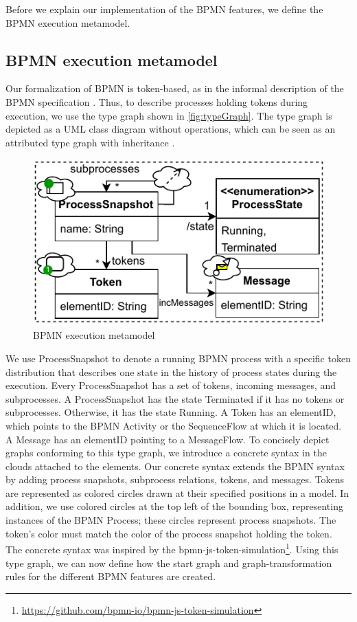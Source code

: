\documentclass[runningheads]{llncs}
\begin{document}
Before we explain our implementation of the BPMN features, we define the BPMN execution metamodel.

\subsection{BPMN execution metamodel}

Our formalization of BPMN is token-based, as in the informal description of the BPMN specification \cite{objectmanagementgroupBusinessProcessModel2013}.
Thus, to describe processes holding tokens during execution, we use the type graph shown in \autoref{fig:typeGraph}.
The type graph is depicted as a UML class diagram without operations, which can be seen as an attributed type graph with inheritance \cite{heckelGraphTransformationSoftware2020}.

\begin{figure}[ht]
  \centering
  \includegraphics[width=0.6\linewidth]{images/bpmn_semantics-typegraph.pdf}
  \caption{BPMN execution metamodel}
  \label{fig:typeGraph}
\end{figure}

We use \textsf{ProcessSnapshot} to denote a running BPMN process with a specific token distribution that describes one state in the history of process states during the execution.
Every \textsf{ProcessSnapshot} has a set of \textsf{tokens}, incoming \textsf{messages}, and \textsf{subprocesses}.
A \textsf{ProcessSnapshot} has the state \textsf{Terminated} if it has no \textsf{tokens} or \textsf{subprocesses}.
Otherwise, it has the state \textsf{Running}.
A \textsf{Token} has an \textsf{elementID}, which points to the BPMN \textsf{Activity} or the \textsf{SequenceFlow} at which it is located.
A \textsf{Message} has an \textsf{elementID} pointing to a \textsf{MessageFlow}.
To concisely depict graphs conforming to this type graph, we introduce a concrete syntax in the clouds attached to the elements.
Our concrete syntax extends the BPMN syntax by adding process snapshots, subprocess relations, tokens, and messages.
Tokens are represented as colored circles drawn at their specified positions in a model.
In addition, we use colored circles at the top left of the bounding box, representing instances of the BPMN \textsf{Process}; these circles represent process snapshots.
The token's color must match the color of the process snapshot holding the token.
The concrete syntax was inspired by the bpmn-js-token-simulation\footnote{\url{https://github.com/bpmn-io/bpmn-js-token-simulation}}.
Using this type graph, we can now define how the start graph and graph-transformation rules for the different BPMN features are created.
\end{document}
